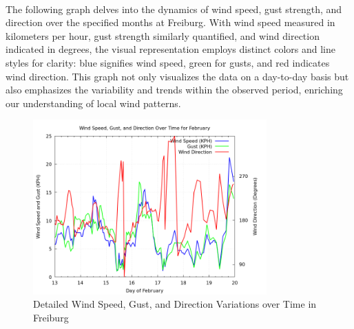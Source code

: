 \documentclass[12pt]{article}
\begin{document}
\paragraph{}The following graph delves into the dynamics of wind speed, gust strength, and direction over the specified months at Freiburg. With wind speed measured in kilometers per hour, gust strength similarly quantified, and wind direction indicated in degrees, the visual representation employs distinct colors and line styles for clarity: blue signifies wind speed, green for gusts, and red indicates wind direction. This graph not only visualizes the data on a day-to-day basis but also emphasizes the variability and trends within the observed period, enriching our understanding of local wind patterns.
\begin{figure}[h]
\centering
\includegraphics[width=0.8\textwidth]{data/graph/wind_speed_gust_direction_graph.png}
\caption{Detailed Wind Speed, Gust, and Direction Variations over Time in Freiburg}
\end{figure}
\end{document}

